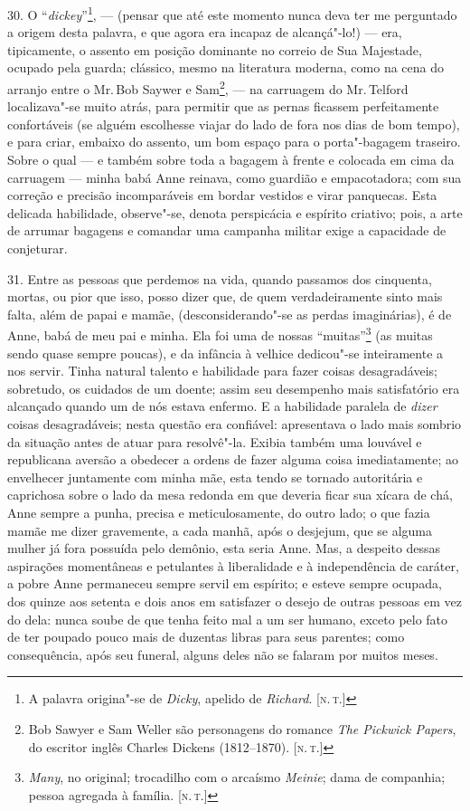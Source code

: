 30. O ``\emph{dickey}''\footnote{A palavra origina"-se de \emph{Dicky},
  apelido de \emph{Richard}. {[}\textsc{n.\,t.}{]}}, --- (pensar que até este
momento nunca deva ter me perguntado a origem desta palavra, e que agora
era incapaz de alcançá"-lo!) --- era, tipicamente, o assento em posição
dominante no correio de Sua Majestade, ocupado pela guarda; clássico,
mesmo na literatura moderna, como na cena do arranjo entre o Mr.\,Bob
Saywer e Sam\footnote{Bob Sawyer e Sam Weller são personagens do romance
  \emph{The Pickwick Papers}, do escritor inglês Charles Dickens
  (1812--1870). {[}\textsc{n.\,t.}{]}}, --- na carruagem do Mr.\,Telford
localizava"-se muito atrás, para permitir que as pernas ficassem
perfeitamente confortáveis (se alguém escolhesse viajar do lado de fora
nos dias de bom tempo), e para criar, embaixo do assento, um bom espaço
para o porta"-bagagem traseiro. Sobre o qual --- e também sobre toda a
bagagem à frente e colocada em cima da carruagem --- minha babá Anne
reinava, como guardião e empacotadora; com sua correção e precisão
incomparáveis em bordar vestidos e virar panquecas. Esta delicada
habilidade, observe"-se, denota perspicácia e espírito criativo; pois, a
arte de arrumar bagagens e comandar uma campanha militar exige a
capacidade de conjeturar.

31. Entre as pessoas que perdemos na vida, quando passamos dos
cinquenta, mortas, ou pior que isso, posso dizer que, de quem
verdadeiramente sinto mais falta, além de papai e mamãe,
(desconsiderando"-se as perdas imaginárias), é de Anne, babá de meu pai e
minha. Ela foi uma de nossas ``muitas''\footnote{\emph{Many}, no
  original; trocadilho com o arcaísmo \emph{Meinie}; dama de companhia;
  pessoa agregada à família. {[}\textsc{n.\,t.}{]}} (as muitas sendo quase
sempre poucas), e da infância à velhice dedicou"-se inteiramente a nos
servir. Tinha natural talento e habilidade para fazer coisas
desagradáveis; sobretudo, os cuidados de um doente; assim seu desempenho
mais satisfatório era alcançado quando um de nós estava enfermo. E a
habilidade paralela de \emph{dizer} coisas desagradáveis; nesta questão
era confiável: apresentava o lado mais sombrio da situação antes de
atuar para resolvê"-la. Exibia também uma louvável e republicana aversão
a obedecer a ordens de fazer alguma coisa imediatamente; ao envelhecer
juntamente com minha mãe, esta tendo se tornado autoritária e caprichosa
sobre o lado da mesa redonda em que deveria ficar sua xícara de chá,
Anne sempre a punha, precisa e meticulosamente, do outro lado; o que
fazia mamãe me dizer gravemente, a cada manhã, após o desjejum, que se
alguma mulher já fora possuída pelo demônio, esta seria Anne. Mas, a
despeito dessas aspirações momentâneas e petulantes à liberalidade e à
independência de caráter, a pobre Anne permaneceu sempre servil em
espírito; e esteve sempre ocupada, dos quinze aos setenta e dois anos em
satisfazer o desejo de outras pessoas em vez do dela: nunca soube de que
tenha feito mal a um ser humano, exceto pelo fato de ter poupado pouco
mais de duzentas libras para seus parentes; como consequência, após seu
funeral, alguns deles não se falaram por muitos meses.

